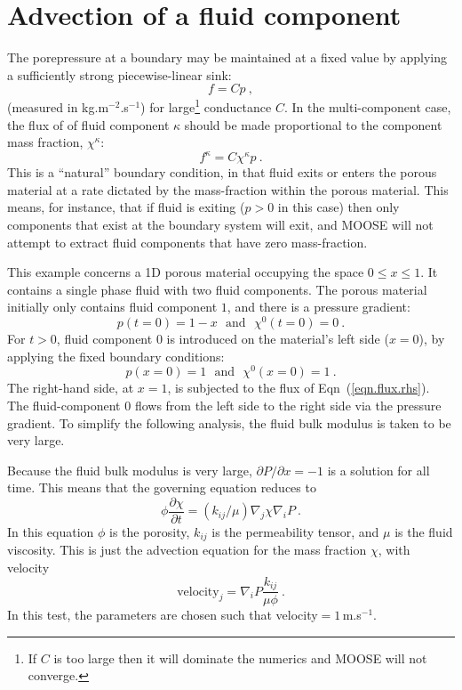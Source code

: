 \documentclass[]{scrreprt}
\begin{document}
\chapter{Advection of a fluid component}

The porepressure at a boundary may be maintained at a fixed value by
applying a sufficiently strong piecewise-linear sink:
\begin{equation}
f = Cp \ ,
\end{equation}
(measured in kg.m$^{-2}$.s$^{-1}$) for large\footnote{If $C$ is too
  large then it will dominate the numerics and MOOSE will not
  converge.} conductance $C$.  In the multi-component case, the flux
of of fluid component $\kappa$ should be made proportional to the
component mass fraction, $\chi^{\kappa}$:
\begin{equation}
f^{\kappa} = C\chi^{\kappa}p \ .
\label{eqn.flux.rhs}
\end{equation}
This is a ``natural'' boundary condition, in that fluid exits or
enters the porous material at a rate dictated by the mass-fraction
within the porous material.  This means, for instance, that if fluid
is exiting ($p>0$ in this case) then only components that exist at the
boundary system will exit, and MOOSE will not attempt to extract fluid
components that have zero mass-fraction.

This example concerns a 1D porous material occupying the space $0\leq
x \leq 1$.  It contains a single phase fluid with two
fluid components.  The porous material initially only contains fluid
component $1$, and there is a pressure gradient:
\begin{equation}
p(t=0) = 1 - x \ \ \ \mbox{and}\ \ \ \chi^{0}(t=0) = 0 \ .
\end{equation}
For $t>0$, fluid component $0$ is introduced on the material's left
side ($x=0$), by applying the fixed boundary conditions:
\begin{equation}
p(x=0) = 1 \ \ \ \mbox{and}\ \ \ \chi^{0}(x=0) = 1 \ .
\end{equation}
The right-hand side, at $x=1$, is subjected to the flux of
Eqn~(\ref{eqn.flux.rhs}).  The fluid-component $0$ flows from the left
side to the right side via the pressure gradient.  To simplify the
following analysis, the fluid bulk modulus is taken to be very large.

Because the fluid bulk modulus is very large, $\partial P/\partial x = -1$ is a
solution for all time.  This means that the governing equation reduces
to
\begin{equation}
\phi \frac{\partial \chi}{\partial t} =  (k_{ij}/\mu) \nabla_{j}
\chi \nabla_{i}P \ .
\end{equation}
In this equation $\phi$ is the porosity, $k_{ij}$ is the permeability
tensor, and $\mu$ is the fluid viscosity.  This is just the advection
equation for the mass fraction $\chi$, with velocity
\begin{equation}
\mbox{velocity}_{j} = \nabla_{i}P\frac{k_{ij}}{\mu\phi} \ .
\end{equation}
In this test, the parameters are chosen such that velocity$=1$\,m.s$^{-1}$.
\end{document}
